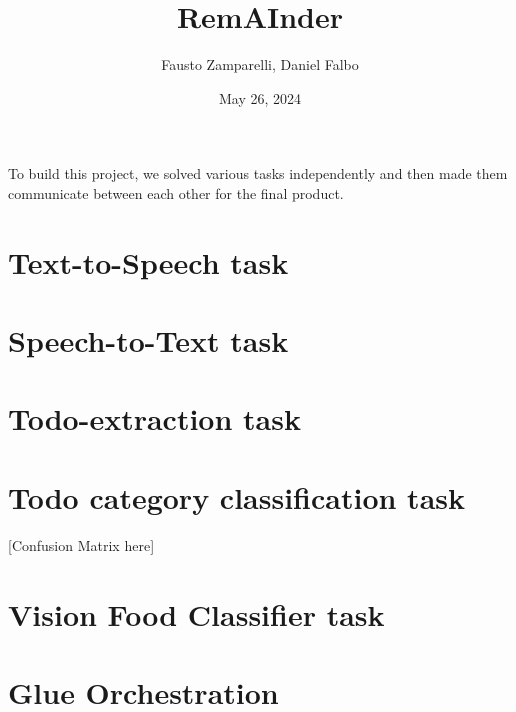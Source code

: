 \documentclass{article}
\title{RemAInder}
\author{Fausto Zamparelli, Daniel Falbo}
\date{May 26, 2024}
\begin{document}
\maketitle

To build this project, we solved various tasks independently and then made them communicate between each other for the final product.


\section*{Text-to-Speech task}

\section*{Speech-to-Text task}

\section*{Todo-extraction task}

\section*{Todo category classification task}

[Confusion Matrix here]

\section*{Vision Food Classifier task}

\section*{Glue Orchestration}
\end{document}
